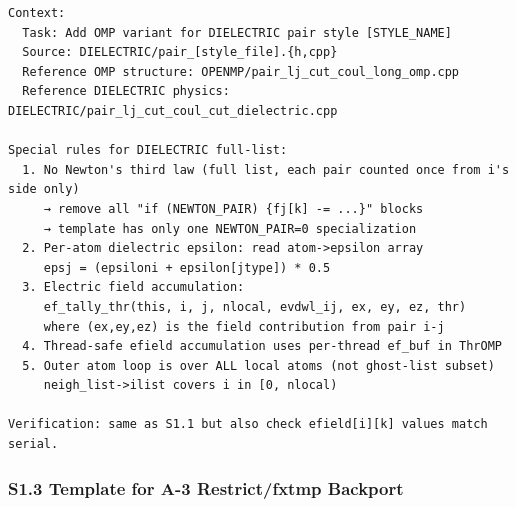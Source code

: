 \documentclass[
  11pt,
]{article}
\begin{document}
\begin{verbatim}
Context:
  Task: Add OMP variant for DIELECTRIC pair style [STYLE_NAME]
  Source: DIELECTRIC/pair_[style_file].{h,cpp}
  Reference OMP structure: OPENMP/pair_lj_cut_coul_long_omp.cpp
  Reference DIELECTRIC physics: DIELECTRIC/pair_lj_cut_coul_cut_dielectric.cpp

Special rules for DIELECTRIC full-list:
  1. No Newton's third law (full list, each pair counted once from i's side only)
     → remove all "if (NEWTON_PAIR) {fj[k] -= ...}" blocks
     → template has only one NEWTON_PAIR=0 specialization
  2. Per-atom dielectric epsilon: read atom->epsilon array
     epsj = (epsiloni + epsilon[jtype]) * 0.5
  3. Electric field accumulation:
     ef_tally_thr(this, i, j, nlocal, evdwl_ij, ex, ey, ez, thr)
     where (ex,ey,ez) is the field contribution from pair i-j
  4. Thread-safe efield accumulation uses per-thread ef_buf in ThrOMP
  5. Outer atom loop is over ALL local atoms (not ghost-list subset)
     neigh_list->ilist covers i in [0, nlocal)

Verification: same as S1.1 but also check efield[i][k] values match serial.
\end{verbatim}

\subsubsection{S1.3 Template for A-3 Restrict/fxtmp
Backport}\label{s1.3-template-for-a-3-restrictfxtmp-backport}
\end{document}
